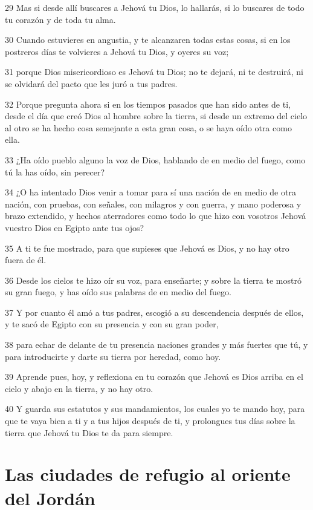\par 29 Mas si desde allí buscares a Jehová tu Dios, lo hallarás, si lo buscares de todo tu corazón y de toda tu alma.
\par 30 Cuando estuvieres en angustia, y te alcanzaren todas estas cosas, si en los postreros días te volvieres a Jehová tu Dios, y oyeres su voz;
\par 31 porque Dios misericordioso es Jehová tu Dios; no te dejará, ni te destruirá, ni se olvidará del pacto que les juró a tus padres.
\par 32 Porque pregunta ahora si en los tiempos pasados que han sido antes de ti, desde el día que creó Dios al hombre sobre la tierra, si desde un extremo del cielo al otro se ha hecho cosa semejante a esta gran cosa, o se haya oído otra como ella.
\par 33 ¿Ha oído pueblo alguno la voz de Dios, hablando de en medio del fuego, como tú la has oído, sin perecer?
\par 34 ¿O ha intentado Dios venir a tomar para sí una nación de en medio de otra nación, con pruebas, con señales, con milagros y con guerra, y mano poderosa y brazo extendido, y hechos aterradores como todo lo que hizo con vosotros Jehová vuestro Dios en Egipto ante tus ojos?
\par 35 A ti te fue mostrado, para que supieses que Jehová es Dios, y no hay otro fuera de él.
\par 36 Desde los cielos te hizo oír su voz, para enseñarte; y sobre la tierra te mostró su gran fuego, y has oído sus palabras de en medio del fuego.
\par 37 Y por cuanto él amó a tus padres, escogió a su descendencia después de ellos, y te sacó de Egipto con su presencia y con su gran poder,
\par 38 para echar de delante de tu presencia naciones grandes y más fuertes que tú, y para introducirte y darte su tierra por heredad, como hoy.
\par 39 Aprende pues, hoy, y reflexiona en tu corazón que Jehová es Dios arriba en el cielo y abajo en la tierra, y no hay otro.
\par 40 Y guarda sus estatutos y sus mandamientos, los cuales yo te mando hoy, para que te vaya bien a ti y a tus hijos después de ti, y prolongues tus días sobre la tierra que Jehová tu Dios te da para siempre.

\section{Las ciudades de refugio al oriente del Jordán}

